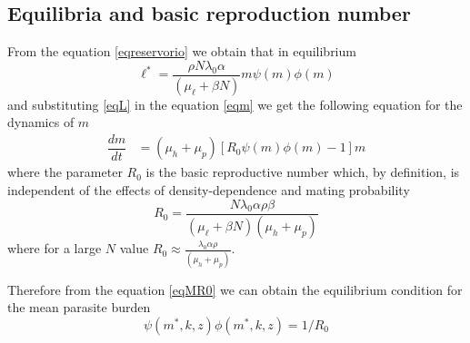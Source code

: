 \documentclass[12pt,a4paper]{article}
\theoremstyle{plain}%
\theoremstyle{definition}
\theoremstyle{remark}
\begin{document}
\subsection{Equilibria and basic reproduction number}
	From the equation \eqref{eqreservorio} we obtain that in equilibrium
	\begin{equation}\label{eqL}
		\ell^*=\frac{\rho N \lambda_0 \alpha}{(\mu_{\ell}+\beta N)} m \psi(m)\phi(m) 
	\end{equation} 
	and substituting \eqref{eqL} in the equation \eqref{eqm} we get the following equation for the dynamics of $m$
	\begin{align}\label{eqMR0}
		\dfrac{dm}{dt}&=(\mu_h + \mu_p)\left[ R_0  \psi(m)\phi(m) -1 \right] m%
	\end{align}
	where the parameter $R_0$ is the basic reproductive number which, by definition, is independent of the effects of density-dependence and  mating probability
	\begin{equation}\label{valorR0}
	R_0=\frac{ N \lambda_0 \alpha  \rho \beta}{ (\mu_{\ell}+\beta N) (\mu_h + \mu_p) }
	\end{equation}
	where for a large $N$ value $R_0\approx \frac{ \lambda_0 \alpha  \rho }{ (\mu_h + \mu_p) }$.
	
	
	
	
	
	Therefore from the equation \eqref{eqMR0} we can obtain the equilibrium condition for the mean parasite burden
	\begin{equation}\label{eqequilibrio}
	\psi(m^*,k,z)\phi(m^*,k,z)=1/R_0
	\end{equation}
	
\end{document}
